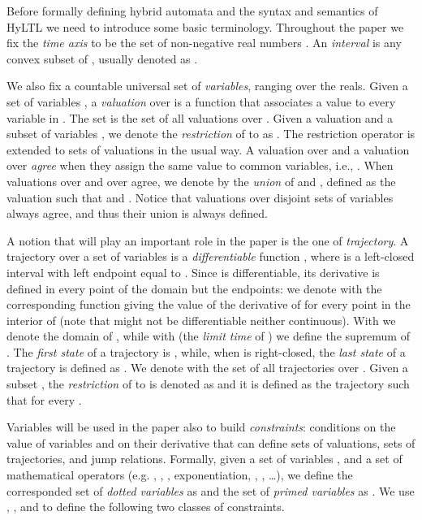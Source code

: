 \documentclass[submission,copyright,creativecommons]{eptcs}
\newcommand{\hyltl}{\textsf{HyLTL}\xspace}
\begin{document}
Before formally defining hybrid automata and the syntax and semantics of \hyltl we need to introduce some basic terminology.
Throughout the paper we fix the \emph{time axis} to be the set of non-negative real numbers . An \emph{interval}  is any convex subset of , usually denoted as . 


We also fix a countable universal set  of \emph{variables}, ranging over the reals. Given a set of variables , a \emph{valuation} over  is a function  that associates a value to every variable in . The set  is the set of all valuations over . Given a valuation  and a subset of variables , we denote the \emph{restriction} of  to  as . 
The restriction operator is extended to sets of valuations in the usual way. A valuation  over  and a valuation  over  \emph{agree} when they assign the same value to common variables, i.e., . When valuations  over  and  over  agree, we denote by  the \emph{union} of  and , defined as the valuation  such that  and . Notice that valuations over disjoint sets of variables always agree, and thus their union is always defined.

\medskip

A notion that will play an important role in the paper is the one of \emph{trajectory}. A trajectory over a set of variables  is a \emph{differentiable} function , where  is a left-closed interval with left endpoint equal to . Since  is differentiable, its derivative is defined in every point of the domain but the endpoints: we denote with  the corresponding function giving the value of the derivative of  for every point in the interior of  (note that  might not be differentiable neither continuous).
With  we denote the domain of , while with  (the \emph{limit time} of ) we define the supremum of . The \emph{first state} of a trajectory is , while, when  is right-closed, the \emph{last state} of a trajectory is defined as . We denote with  the set of all trajectories over . Given a subset , the \emph{restriction} of  to  is denoted as  and it is defined as the trajectory  such that  for every . 




\medskip

Variables will be used in the paper also to build \emph{constraints}: conditions on the value of variables and on their derivative that can define sets of valuations, sets of trajectories, and jump relations. Formally, given a set of variables , and a set of mathematical operators  (e.g. , , , exponentiation, , , \dots), we define the corresponded set of \emph{dotted variables}  as  and the set of \emph{primed variables}  as . We use , ,  and  to define the following two classes of constraints.
\end{document}
